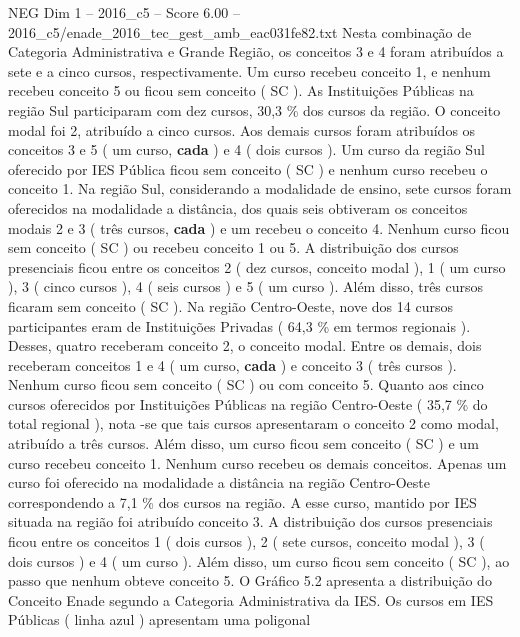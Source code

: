 \begin{textsample}{NEG Dim 1 – 2016\_c5 – Score 6.00 – 2016\_c5/enade\_2016\_tec\_gest\_amb\_eac031fe82.txt}
Nesta combinação de Categoria Administrativa e Grande Região, os conceitos 3 e 4 foram atribuídos a sete e a cinco cursos, respectivamente.
Um curso recebeu conceito 1, e nenhum recebeu conceito 5 ou ficou sem conceito ( SC ).
As Instituições Públicas na região Sul participaram com dez cursos, 30,3 \% dos cursos da região.
O conceito modal foi 2, atribuído a cinco cursos.
Aos demais cursos foram atribuídos os conceitos 3 e 5 ( um curso, \textbf{cada} ) e 4 ( dois cursos ).
Um curso da região Sul oferecido por IES Pública ficou sem conceito ( SC ) e nenhum curso recebeu o conceito 1.
Na região Sul, considerando a modalidade de ensino, sete cursos foram oferecidos na modalidade a distância, dos quais seis obtiveram os conceitos modais 2 e 3 ( três cursos, \textbf{cada} ) e um recebeu o conceito 4.
Nenhum curso ficou sem conceito ( SC ) ou recebeu conceito 1 ou 5.
A distribuição dos cursos presenciais ficou entre os conceitos 2 ( dez cursos, conceito modal ), 1 ( um curso ), 3 ( cinco cursos ), 4 ( seis cursos ) e 5 ( um curso ).
Além disso, três cursos ficaram sem conceito ( SC ).
Na região Centro-Oeste, nove dos 14 cursos participantes eram de Instituições Privadas ( 64,3 \% em termos regionais ).
Desses, quatro receberam conceito 2, o conceito modal.
Entre os demais, dois receberam conceitos 1 e 4 ( um curso, \textbf{cada} ) e conceito 3 ( três cursos ).
Nenhum curso ficou sem conceito ( SC ) ou com conceito 5.
Quanto aos cinco cursos oferecidos por Instituições Públicas na região Centro-Oeste ( 35,7 \% do total regional ), nota -se que tais cursos apresentaram o conceito 2 como modal, atribuído a três cursos.
Além disso, um curso ficou sem conceito ( SC ) e um curso recebeu conceito 1.
Nenhum curso recebeu os demais conceitos.
Apenas um curso foi oferecido na modalidade a distância na região Centro-Oeste correspondendo a 7,1 \% dos cursos na região.
A esse curso, mantido por IES situada na região foi atribuído conceito 3.
A distribuição dos cursos presenciais ficou entre os conceitos 1 ( dois cursos ), 2 ( sete cursos, conceito modal ), 3 ( dois cursos ) e 4 ( um curso ).
Além disso, um curso ficou sem conceito ( SC ), ao passo que nenhum obteve conceito 5.
O Gráfico 5.2 apresenta a distribuição do Conceito Enade segundo a Categoria Administrativa da IES.
Os cursos em IES Públicas ( linha azul ) apresentam uma poligonal

\end{textsample}
